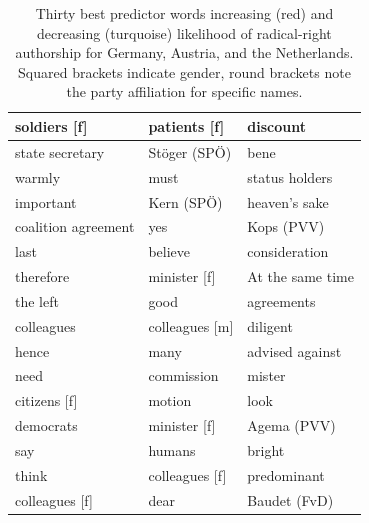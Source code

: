 \documentclass{article}
\begin{document}
\begin{table}[ht!]
\begin{tabular}{|l|l|l|}
\rowcolor[HTML]{F8766D} 
\cellcolor[HTML]{00BFC4}soldiers {[}f{]} & patients {[}f{]}            & discount                 \\ \hline
\rowcolor[HTML]{F8766D} 
\cellcolor[HTML]{00BFC4}state secretary  & Stöger (SPÖ)                & bene                     \\ \hline
\rowcolor[HTML]{F8766D} 
\cellcolor[HTML]{00BFC4}warmly           & must                        & status holders           \\ \hline
\rowcolor[HTML]{F8766D} 
\cellcolor[HTML]{00BFC4}important        & Kern (SPÖ)                  & heaven’s sake            \\ \hline
\rowcolor[HTML]{00BFC4} 
coalition agreement                      & \cellcolor[HTML]{F8766D}yes & Kops {(}PVV{)}           \\ \hline
\rowcolor[HTML]{00BFC4} 
last                                     & believe                     & consideration            \\ \hline
\rowcolor[HTML]{00BFC4} 
therefore                                & minister {[}f{]}            & At the same time         \\ \hline
\rowcolor[HTML]{00BFC4} 
the left                                 & good                        & agreements               \\ \hline
\rowcolor[HTML]{00BFC4} 
colleagues                               & colleagues {[}m{]}          & diligent                 \\ \hline
\rowcolor[HTML]{00BFC4} 
hence                                    & many                        & advised against          \\ \hline
\rowcolor[HTML]{00BFC4} 
need                                     & commission                  & mister                   \\ \hline
\rowcolor[HTML]{00BFC4} 
citizens {[}f{]}                         & motion                      & look                     \\ \hline
\rowcolor[HTML]{00BFC4} 
democrats                                & minister {[}f{]}            & Agema {(}PVV{)}          \\ \hline
\rowcolor[HTML]{00BFC4} 
say                                      & humans                      & bright                   \\ \hline
\rowcolor[HTML]{00BFC4} 
think                                    & colleagues {[}f{]}          & predominant              \\ \hline
\rowcolor[HTML]{00BFC4} 
colleagues {[}f{]}                       & dear                        & Baudet {(}FvD{)}         \\ \hline
\end{tabular}
\caption{Thirty best predictor words increasing (red) and decreasing (turquoise) likelihood of radical-right authorship for Germany, Austria, and the Netherlands. Squared brackets indicate gender, round brackets note the party affiliation for specific names.}
\label{tab:bpws}
\end{table}
\end{document}
